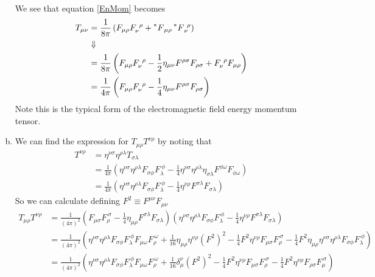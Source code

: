 \documentclass[11pt]{article}
\numberwithin{equation}{section}
\begin{document}
\begin{enumerate}[(a)]
\begin{align*}
    \end{align*}
    We see that equation \ref{EnMom} becomes
    \begin{align*}
        T_{\mu\nu} &= \frac{1}{8\pi}\left(F_{\mu\rho}F^{\ \rho}_{\nu} + \prescript{*}{}{F}_{\mu\rho}\prescript{*}{}{F}^{\ \rho}_{\nu}\right)\\
                   &\Downarrow\\
                   &= \frac{1}{8\pi}\left(F_{\mu\rho}F^{\ \rho}_{\nu} - \frac{1}{2}\eta_{\mu\nu}F^{\rho\sigma}F_{\rho\sigma} + F^{\ \rho}_{\nu}F_{\mu\rho}\right)\\
                   &= \frac{1}{4\pi}\left(F_{\mu\rho}F^{\ \rho}_{\nu} - \frac{1}{4}\eta_{\mu\nu}F^{\rho\sigma}F_{\rho\sigma} \right)\\
    \end{align*}
    Note this is the typical form of the electromagnetic field energy momentum tensor.

\item
    We can find the expression for $T_{\mu\rho}T^{\nu\rho}$ by noting that
    \begin{align*}
        T^{\nu\rho} &= \eta^{\nu\sigma}\eta^{\rho\lambda}T_{\sigma\lambda}\\
                    &= \frac{1}{4\pi}\left(\eta^{\nu\sigma}\eta^{\rho\lambda}F_{\sigma\phi}F_{\lambda}^{\ \phi} - \frac{1}{4}\eta^{\nu\sigma}\eta^{\rho\lambda}\eta_{\sigma\lambda}F^{\phi\omega}F_{\phi\omega}\right)\\
                    &= \frac{1}{4\pi}\left(\eta^{\nu\sigma}\eta^{\rho\lambda}F_{\sigma\phi}F_{\lambda}^{\ \phi} - \frac{1}{4}\eta^{\nu\rho}F^{\sigma\lambda}F_{\sigma\lambda}\right)
    \end{align*}
    So we can calculate defining $F^2\equiv F^{\mu\nu}F_{\mu\nu}$
    \begin{align*}
        T_{\mu\rho}T^{\nu\rho} &= \frac{1}{(4\pi)^2}\left(F_{\mu\sigma}F^{\ \sigma}_{\rho} - \frac{1}{4}\eta_{\mu\rho}F^{\sigma\lambda}F_{\sigma\lambda} \right)\left(\eta^{\nu\sigma}\eta^{\rho\lambda}F_{\sigma\phi}F_{\lambda}^{\ \phi} - \frac{1}{4}\eta^{\nu\rho}F^{\sigma\lambda}F_{\sigma\lambda}\right)\\
                               &= \frac{1}{(4\pi)^2}\left(\eta^{\nu\sigma}\eta^{\rho\lambda}F_{\sigma\phi}F_{\lambda}^{\ \phi}F_{\mu\omega}F^{\ \omega}_{\rho} + \frac{1}{16}\eta_{\mu\rho}\eta^{\nu\rho}(F^2)^2 - \frac{1}{4}F^2\eta^{\nu\rho}F_{\mu\sigma}F^{\ \sigma}_{\rho} - \frac{1}{4}F^2\eta_{\mu\rho}\eta^{\nu\sigma}\eta^{\rho\lambda}F_{\sigma\phi}F_{\lambda}^{\ \phi}\right)\\
                               &= \frac{1}{(4\pi)^2}\left(\eta^{\nu\sigma}\eta^{\rho\lambda}F_{\sigma\phi}F_{\lambda}^{\ \phi}F_{\mu\omega}F^{\ \omega}_{\rho} + \frac{1}{16}\delta^{\nu}_{\mu}(F^2)^2 - \frac{1}{4}F^2\eta^{\nu\rho}F_{\mu\sigma}F^{\ \sigma}_{\rho} - \frac{1}{4}F^2\eta^{\nu\rho}F_{\rho\sigma}F_{\mu}^{\ \sigma}\right)
    \end{align*}
    

\end{enumerate}
\end{document}
